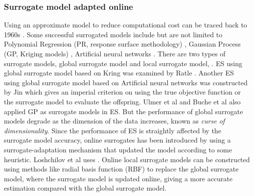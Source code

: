 \subsubsection{Surrogate model adapted online}




Using an approximate model to reduce computational cost can be traced back to 1960s \cite{dunham1963design}. Some successful surrogated models include but are not limited to Polynomial Regression (PR, response surface methodology) \cite{doi:10.1080/00401706.1966.10490404}, Gaussian Process (GP, Kriging models) \cite{sacks1989}, Artificial neural networks \cite{Smith:1993:NNS:583180}. There are two types of surrogate models, global surrogate model and local surrogate model, . ES using global surrogate model based on Kring was examined by Ratle \cite{Ratle:2001:KSF:966173.966177}. Another ES using global surrogate model based on Artificial neural networks was constructed by Jin \cite{Jin02aframework} which gives an imperial criterion on using the true objective function or the surrogate model to evaluate the offspring. Ulmer et al \cite{Ulmer03evolutionstrategies} and Buche et al \cite{1424193} also applied GP as surrogate models in ES. But the performance of global surrogate models degrade as the dimension of the data increases, known as \textit{curse of dimensionality}. Since the performance of ES is straightly affected by the surrogate model accuracy, online surrogates has been introduced by using a surrogate-adaptation mechanism that updated the model according to some heuristic. Loshchilov et al \cite{loshchilov2012self} uses .
Online local surrogate models \cite{4033013} can be constructed using methods like radial basis function (RBF) \cite{GIANNAKOGLOU200243} to replace the global surrogate model, where the surrogate model is updated online, giving a more accurate estimation compared with the global surrogate model.







